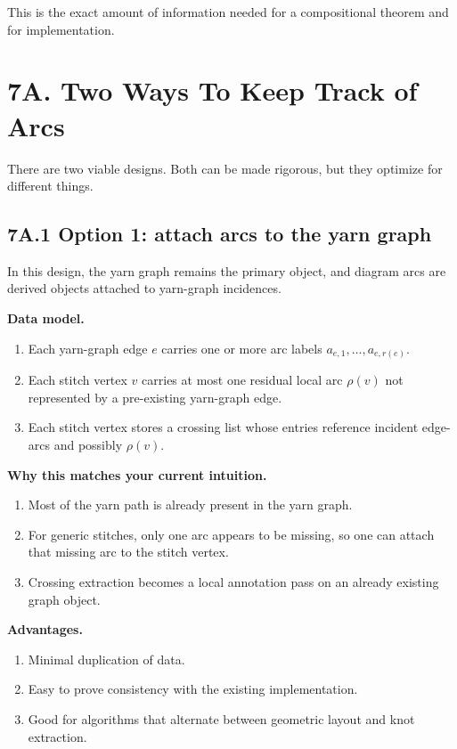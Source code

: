 \documentclass[11pt]{article}
\begin{document}
This is the exact amount of information needed for a compositional theorem and for implementation.

\section*{7A. Two Ways To Keep Track of Arcs}
There are two viable designs. Both can be made rigorous, but they optimize for different things.

\subsection*{7A.1 Option 1: attach arcs to the yarn graph}
In this design, the yarn graph remains the primary object, and diagram arcs are derived objects attached to yarn-graph incidences.

\textbf{Data model.}
\begin{enumerate}[leftmargin=1.5em,itemsep=0.2em]
    \item Each yarn-graph edge \(e\) carries one or more arc labels \(a_{e,1},\dots,a_{e,r(e)}\).
    \item Each stitch vertex \(v\) carries at most one residual local arc \(\rho(v)\) not represented by a pre-existing yarn-graph edge.
    \item Each stitch vertex stores a crossing list whose entries reference incident edge-arcs and possibly \(\rho(v)\).
\end{enumerate}

\textbf{Why this matches your current intuition.}
\begin{enumerate}[leftmargin=1.5em,itemsep=0.2em]
    \item Most of the yarn path is already present in the yarn graph.
    \item For generic stitches, only one arc appears to be missing, so one can attach that missing arc to the stitch vertex.
    \item Crossing extraction becomes a local annotation pass on an already existing graph object.
\end{enumerate}

\textbf{Advantages.}
\begin{enumerate}[leftmargin=1.5em,itemsep=0.2em]
    \item Minimal duplication of data.
    \item Easy to prove consistency with the existing implementation.
    \item Good for algorithms that alternate between geometric layout and knot extraction.
\end{enumerate}
\end{document}
